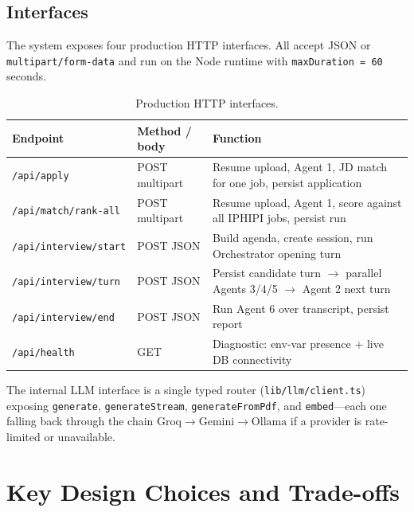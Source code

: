 \documentclass[11pt,a4paper]{article}
\begin{document}
\subsection{Interfaces}

The system exposes four production HTTP interfaces. All accept JSON or
\texttt{multipart/form-data} and run on the Node runtime with
\texttt{maxDuration = 60} seconds.

\begin{table}[h]
\centering
\renewcommand{\arraystretch}{1.25}
\begin{tabular}{@{}p{4.6cm} p{4.0cm} p{6.4cm}@{}}
\toprule
\textbf{Endpoint} & \textbf{Method / body} & \textbf{Function} \\
\midrule
\texttt{/api/apply}                    & POST multipart  & Resume upload, Agent 1, JD match for one job, persist application \\
\texttt{/api/match/rank-all}           & POST multipart  & Resume upload, Agent 1, score against all IPHIPI jobs, persist run \\
\texttt{/api/interview/start}          & POST JSON       & Build agenda, create session, run Orchestrator opening turn \\
\texttt{/api/interview/turn}           & POST JSON       & Persist candidate turn $\rightarrow$ parallel Agents 3/4/5 $\rightarrow$ Agent 2 next turn \\
\texttt{/api/interview/end}            & POST JSON       & Run Agent 6 over transcript, persist report \\
\texttt{/api/health}                   & GET             & Diagnostic: env-var presence + live DB connectivity \\
\bottomrule
\end{tabular}
\caption{Production HTTP interfaces.}
\end{table}

The internal LLM interface is a single typed router (\texttt{lib/llm/client.ts})
exposing \texttt{generate}, \texttt{generateStream}, \texttt{generateFromPdf},
and \texttt{embed}---each one falling back through the chain
$\text{Groq} \rightarrow \text{Gemini} \rightarrow \text{Ollama}$ if a
provider is rate-limited or unavailable.

\section{Key Design Choices and Trade-offs}\label{sec:choices}
\end{document}

